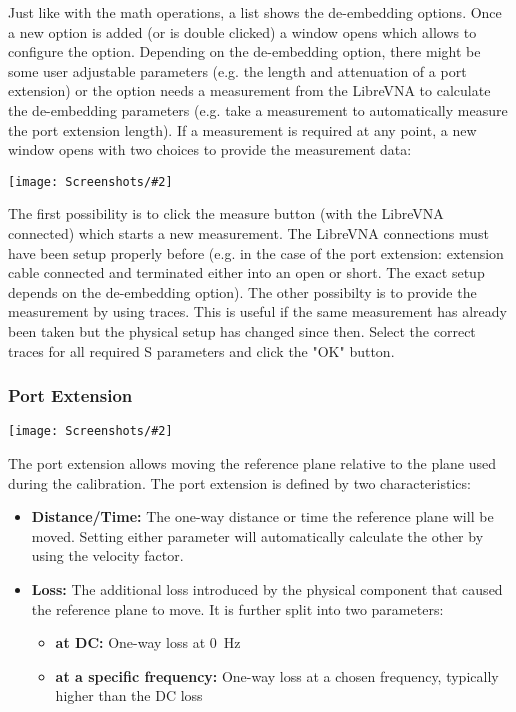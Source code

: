 \documentclass[a4paper,11pt]{article}
\newcommand{\vna}{LibreVNA}
\newcommand{\screenshot}[2]{\begin{center}
\texttt{[image: Screenshots/\#2]}
\end{center}}
\begin{document}
Just like with the math operations, a list shows the de-embedding options. Once a new option is added (or is double clicked) a window opens which allows to configure the option. Depending on the de-embedding option, there might be some user adjustable parameters (e.g. the length and attenuation of a port extension) or the option needs a measurement from the \vna{} to calculate the de-embedding parameters (e.g. take a measurement to automatically measure the port extension length). If a measurement is required at any point, a new window opens with two choices to provide the measurement data:
\screenshot{0.9}{DeembeddingMeas.png}
The first possibility is to click the measure button (with the \vna{} connected) which starts a new measurement. The \vna{} connections must have been setup properly before (e.g. in the case of the port extension: extension cable connected and terminated either into an open or short. The exact setup depends on the de-embedding option). The other possibilty is to provide the measurement by using traces. This is useful if the same measurement has already been taken but the physical setup has changed since then. Select the correct traces for all required S parameters and click the "OK" button.

\subsubsection{Port Extension}
\screenshot{0.4}{DeembeddingPortExtension.png}
The port extension allows moving the reference plane relative to the plane used during the calibration. The port extension is defined by two characteristics:
\begin{itemize}
\item \textbf{Distance/Time:} The one-way distance or time the reference plane will be moved. Setting either parameter will automatically calculate the other by using the velocity factor.
\item \textbf{Loss:} The additional loss introduced by the physical component that caused the reference plane to move. It is further split into two parameters:
\begin{itemize}
\item \textbf{at DC:} One-way loss at \SI{0}{\hertz}
\item \textbf{at a specific frequency:} One-way loss at a chosen frequency, typically higher than the DC loss
\end{itemize}
\end{itemize}
\end{document}
